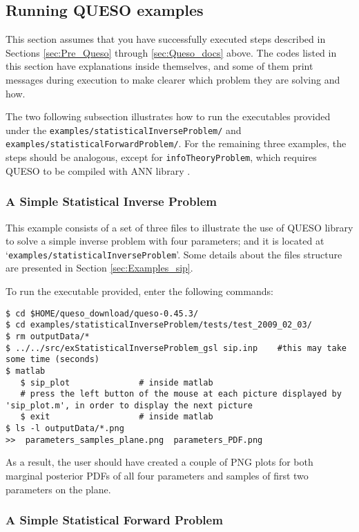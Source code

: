 \subsection{Running QUESO examples} \label{sc-running-execs}

This section assumes that you have successfully executed steps described in Sections \ref{sec:Pre_Queso} through \ref{sec:Queso_docs} above.
The codes listed in this section have explanations inside themselves, and some of them
print messages during execution to make clearer which problem they are solving and how. 


The two following subsection illustrates how to run the executables provided under the \verb+examples/statisticalInverseProblem/+ and \verb+examples/statisticalForwardProblem/+. For the remaining three examples, the steps should be analogous, except for \verb+infoTheoryProblem+, which requires QUESO to be compiled with ANN library \cite{ANN}.

\subsubsection{A Simple Statistical Inverse Problem}\label{sec:executable_sip}

This example consists of a set  of three files to illustrate the use of QUESO library to solve a simple inverse problem with four parameters; and it is located at `\verb+examples/statisticalInverseProblem+'. Some details about the files structure are presented in Section \ref{sec:Examples_sip}.

To run the executable provided, enter the following commands:
\begin{lstlisting}[label={},caption={}]
$ cd $HOME/queso_download/queso-0.45.3/
$ cd examples/statisticalInverseProblem/tests/test_2009_02_03/
$ rm outputData/*
$ ../../src/exStatisticalInverseProblem_gsl sip.inp    #this may take some time (seconds)
$ matlab
   $ sip_plot	           # inside matlab
   # press the left button of the mouse at each picture displayed by 'sip_plot.m', in order to display the next picture
   $ exit	               # inside matlab
$ ls -l outputData/*.png
>>  parameters_samples_plane.png  parameters_PDF.png
\end{lstlisting}

As a result, the user should have created a couple of PNG plots for both marginal posterior PDFs of all four parameters and samples of first two parameters on the plane.

\subsubsection{A Simple Statistical Forward Problem}

